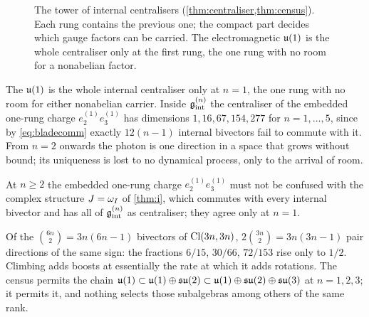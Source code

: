 \begin{figure}[t]
\centering
{}
\caption{The tower of internal centralisers (\cref{thm:centraliser,thm:census}). Each rung contains the previous one; the compact part
decides which gauge factors can be carried. The electromagnetic $\mathfrak{u}(1)$ is the whole centraliser only at the first rung, the one rung
with no room for a nonabelian factor.}
\label{fig:tower}
\end{figure}

\begin{corollary}
\label{cor:tradeoff}
The $\mathfrak{u}(1)$ is the whole internal centraliser only at $n=1$, the one rung with no room for either nonabelian carrier. Inside
$\mathfrak g_{\rm int}^{(n)}$ the centraliser of the embedded one-rung charge $e^{(1)}_2e^{(1)}_3$ has dimensions $1,16,67,154,277$ for $n=1,\dots,5$,
since by \eqref{eq:bladecomm} exactly $12(n-1)$ internal bivectors fail to commute with it. From $n=2$ onwards the photon is one
direction in a space that grows without bound; its uniqueness is lost to no dynamical process, only to the arrival of room.
\end{corollary}

At $n\ge2$ the embedded one-rung charge $e^{(1)}_2e^{(1)}_3$ must not be confused with the complex structure $J=\omega_I$ of
\cref{thm:i}, which commutes with every internal bivector and has all of $\mathfrak g_{\rm int}^{(n)}$ as centraliser; they agree only at $n=1$.

\begin{remark}
Of the $\binom{6n}2=3n(6n-1)$ bivectors of $\mathrm{Cl}(3n,3n)$, $2\binom{3n}2=3n(3n-1)$ pair directions of the same sign: the fractions
$6/15$, $30/66$, $72/153$ rise only to $1/2$. Climbing adds boosts at essentially the rate at which it adds rotations. The census
permits the chain $\mathfrak{u}(1)\subset\mathfrak{u}(1)\oplus\mathfrak{su}(2)\subset\mathfrak{u}(1)\oplus\mathfrak{su}(2)\oplus\mathfrak{su}(3)$ at $n=1,2,3$; it permits it, and nothing selects those
subalgebras among others of the same rank.
\end{remark}
